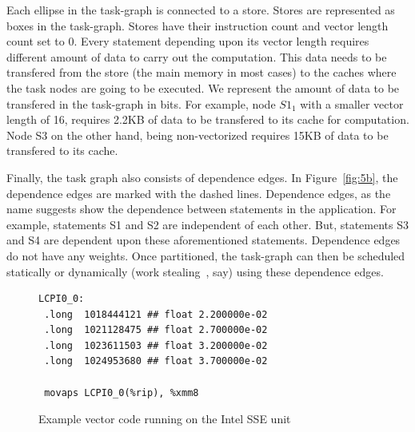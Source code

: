 Each ellipse in the task-graph is connected to a store. Stores are
represented as boxes in the task-graph. Stores have their instruction
count and vector length count set to 0. Every statement depending upon
its vector length requires different amount of data to carry out the
computation. This data needs to be transfered from the store (the main
memory in most cases) to the caches where the task nodes are going to be
executed. We represent the amount of data to be transfered in the
task-graph in bits. For example, node $S1_1$ with a smaller vector
length of 16, requires 2.2KB of data to be transfered to its cache for
computation. Node S3 on the other hand, being non-vectorized requires
15KB of data to be transfered to its cache.

Finally, the task graph also consists of dependence edges. In
Figure~\ref{fig:5b}, the dependence edges are marked with the dashed
lines. Dependence edges, as the name suggests show the dependence
between statements in the application. For example, statements S1 and S2
are independent of each other. But, statements S3 and S4 are dependent
upon these aforementioned statements. Dependence edges do not have any
weights. Once partitioned, the task-graph can then be scheduled
statically or dynamically (work stealing~\cite{rblu99}, say) using these
dependence edges.

\begin{figure}[h!]
  \centering
  \small{
\begin{verbatim}
LCPI0_0:
 .long	1018444121 ## float 2.200000e-02
 .long	1021128475 ## float 2.700000e-02
 .long	1023611503 ## float 3.200000e-02
 .long	1024953680 ## float 3.700000e-02

 movaps	LCPI0_0(%rip), %xmm8
\end{verbatim}
  }
  \caption{Example vector code running on the Intel SSE unit}
  \label{fig:6}
\end{figure}





